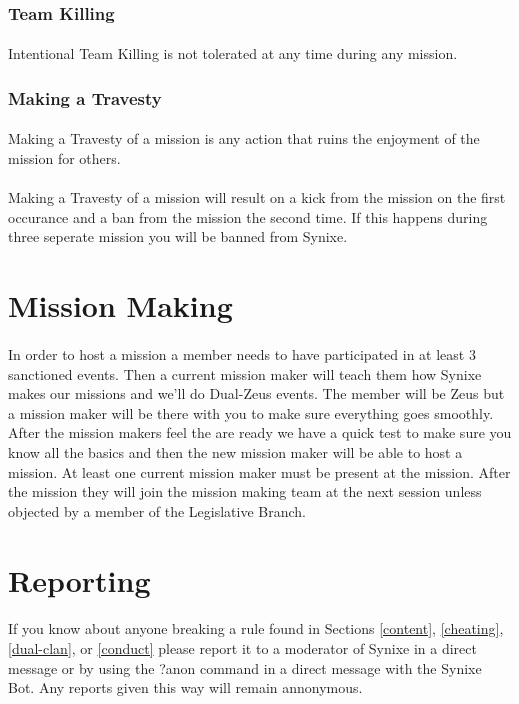 \documentclass[10pt,a4paper]{article}
\begin{document}
\subsubsection{Team Killing}
\paragraph{}
Intentional Team Killing is not tolerated at any time during any mission.
\subsubsection{Making a Travesty}
\paragraph{}
Making a Travesty of a mission is any action that ruins the enjoyment of the mission for others.
\paragraph{}
Making a Travesty of a mission will result on a kick from the mission on the first occurance and a ban from the mission the second time. If this happens during three seperate mission you will be banned from Synixe.
\section{Mission Making}
\paragraph{}
In order to host a mission a member needs to have participated in at least 3 sanctioned events. Then a current mission maker will teach them how Synixe makes our missions and we'll do Dual-Zeus events. The member will be Zeus but a mission maker will be there with you to make sure everything goes smoothly. After the mission makers feel the are ready we have a quick test to make sure you know all the basics and then the new mission maker will be able to host a mission. At least one current mission maker must be present at the mission. After the mission they will join the mission making team at the next session unless objected by a member of the Legislative Branch.
\section{Reporting}
\paragraph{}
If you know about anyone breaking a rule found in Sections \ref{content}, \ref{cheating}, \ref{dual-clan}, or \ref{conduct} please report it to a moderator of Synixe in a direct message or by using the ?anon command in a direct message with the Synixe Bot. Any reports given this way will remain annonymous.
\end{document}
